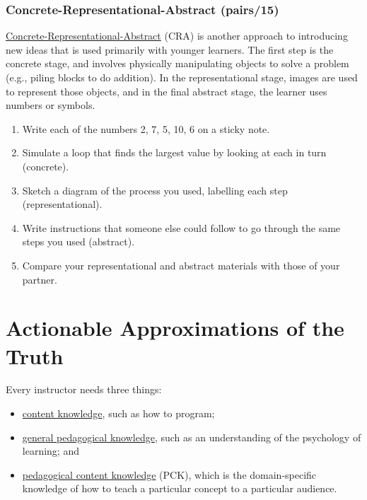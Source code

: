 \subsection{Concrete-Representational-Abstract (pairs/15)}\label{concrete-representational-abstract-pairs15}

\href{https://makingeducationfun.wordpress.com/2012/04/29/concrete-representational-abstract-cra/}{Concrete-Representational-Abstract} (CRA) is another approach to
introducing new ideas that is used primarily with younger
learners. The first step is the concrete stage, and involves
physically manipulating objects to solve a problem (e.g., piling
blocks to do addition). In the representational stage, images are
used to represent those objects, and in the final abstract stage, the
learner uses numbers or symbols.

\begin{enumerate}
\item
  Write each of the numbers 2, 7, 5, 10, 6 on a sticky note.
\item
  Simulate a loop that finds the largest value by looking at each in
  turn (concrete).
\item
  Sketch a diagram of the process you used, labelling each step
  (representational).
\item
  Write instructions that someone else could follow to go through the
  same steps you used (abstract).
\item
  Compare your representational and abstract materials with those of
  your partner.
\end{enumerate}

\chapter{Actionable Approximations of the Truth}\label{s:pck}

Every instructor needs three things:

\begin{itemize}
\item
  \protect\hyperlink{g:content-knowledge}{content knowledge}, such as how to
  program;
\item
  \protect\hyperlink{g:general-pedagogical-knowledge}{general pedagogical knowledge},
  such as an understanding of the psychology of learning; and
\item
  \protect\hyperlink{g:pedagogical-content-knowledge}{pedagogical content knowledge}
  (PCK), which is the domain-specific knowledge of how to teach a
  particular concept to a particular audience.
\end{itemize}


